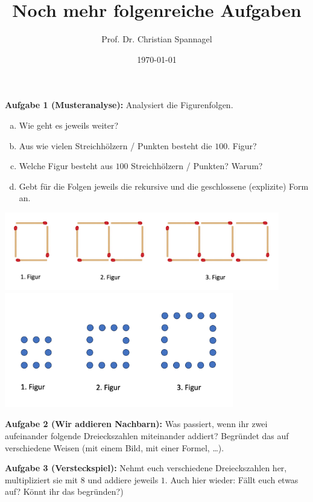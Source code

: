 \documentclass{../cssheet}
\title{Noch mehr folgenreiche Aufgaben}
\author{Prof. Dr. Christian Spannagel}
\date{\today}
\begin{document}
\printtitle


\textbf{Aufgabe 1 (Musteranalyse):}  Analysiert die Figurenfolgen.
\begin{enumerate}[a)]
\item Wie geht es jeweils weiter? 
\item Aus wie vielen Streichhölzern / Punkten besteht die $100.$ Figur? 
\item Welche Figur besteht aus $100$ Streichhölzern / Punkten? Warum?
\item Gebt für die Folgen jeweils die rekursive und die geschlossene (explizite) Form an.
\end{enumerate}

\begin{center}
\includegraphics[width=12cm]{streichhoelzer.png}
\includegraphics[width=10cm]{punktemuster.png}
\end{center}


\textbf{Aufgabe 2 (Wir addieren Nachbarn):}  Was passiert, wenn ihr zwei aufeinander folgende
Dreieckszahlen miteinander addiert? Begründet das auf verschiedene Weisen (mit einem
Bild, mit einer Formel, \ldots).


\textbf{Aufgabe 3 (Versteckspiel):}  Nehmt euch verschiedene Dreieckszahlen her, multipliziert sie mit $8$ und addiere jeweils $1$. Auch hier wieder: Fällt euch etwas auf? Könnt ihr das begründen?) 


\vspace*{10mm}
\printlicense

\printsocials
\end{document}
